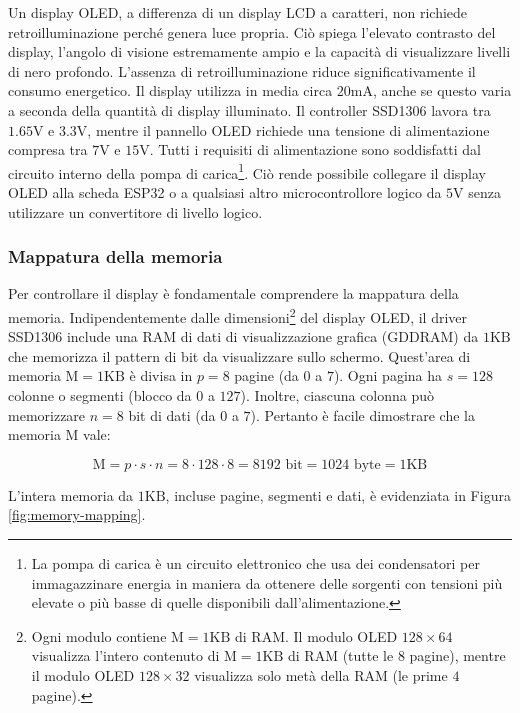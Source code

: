 \documentclass[a4paper,12pt]{report}  %
\begin{document}
Un display OLED, a differenza di un display LCD a caratteri, non richiede retroilluminazione perché genera luce propria.
Ciò spiega l'elevato contrasto del display, l'angolo di visione estremamente ampio e la capacità di visualizzare livelli di nero profondo.
L'assenza di retroilluminazione riduce signiﬁcativamente il consumo energetico.
Il display utilizza in media circa $20 \text{mA}$, anche se questo varia a seconda della quantità di display illuminato.
Il controller SSD1306 lavora tra $1.65 \text{V}$ e $3.3 \text{V}$, mentre il pannello OLED richiede una tensione di alimentazione compresa tra $7 \text{V}$ e $15 \text{V}$.
Tutti i requisiti di alimentazione sono soddisfatti dal circuito interno della pompa di carica\footnote{La pompa di carica è un circuito elettronico che usa dei condensatori per immagazzinare energia in maniera da ottenere delle sorgenti con tensioni più elevate o più basse di quelle disponibili dall'alimentazione.}.
Ciò rende possibile collegare il display OLED alla scheda ESP32 o a qualsiasi altro microcontrollore logico da $5 \text{V}$ senza utilizzare un convertitore di livello logico.

\subsubsection{Mappatura della memoria}
Per controllare il display è fondamentale comprendere la mappatura della memoria.
Indipendentemente dalle dimensioni\footnote{Ogni modulo contiene $\text{M} = 1 \text{KB}$ di RAM. Il modulo OLED $128 \times 64$ visualizza l'intero contenuto di $\text{M} = 1 \text{KB}$ di RAM (tutte le $8$ pagine), mentre il modulo OLED $128 \times 32$ visualizza solo metà della RAM (le prime $4$ pagine).} del display OLED, il driver SSD1306 include una RAM di dati di visualizzazione graﬁca (GDDRAM) da $1 \text{KB}$ che memorizza il pattern di bit da visualizzare sullo schermo.
Quest'area di memoria $\text{M} = 1 \text{KB}$ è divisa in $p = 8$ pagine (da $0$ a $7$).
Ogni pagina ha $s = 128$ colonne o segmenti (blocco da $0$ a $127$).
Inoltre, ciascuna colonna può memorizzare $n = 8$ bit di dati (da $0$ a $7$).
Pertanto è facile dimostrare che la memoria $\text{M}$ vale:

\begin{equation}
    \text{M} = p \cdot s \cdot n = 8 \cdot 128 \cdot 8 = 8192 \text{ bit} = 1024 \text{ byte} = 1 \text{KB} \nonumber
\end{equation}

L'intera memoria da $1 \text{KB}$, incluse pagine, segmenti e dati, è evidenziata in Figura \ref{fig:memory-mapping}.
\end{document}
